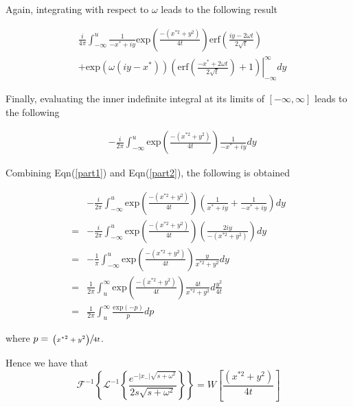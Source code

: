 \documentclass[10pt,a4,fleqn]{article}
\begin{document}
Again, integrating with respect to $\omega$ leads to the following result

\begin{equation}
\begin{split}
 &\frac{i}{4\pi}\int_{-\infty}^u \frac{1}{-x^*+iy}
   \mathrm{exp}\left(\frac{-(x^{*2} + y^2)}{4t}\right) 
   \mathrm{erf}\left(\frac{iy - 2\omega t}{2\sqrt{t}}\right)\\
    & +\left. \mathrm{exp}\left(\omega\left(iy - x^*\right)\right)\left(\mathrm{erf}\left(\frac{-x^*+2\omega t}{2\sqrt{t}}\right)+1\right) 
    \right\vert_{-\infty}^{\infty} dy
   \end{split}
\end{equation}

Finally, evaluating the inner indefinite integral at its limits of $\left[-\infty, \infty\right]$ leads to the following  

\begin{equation}\label{part2}
\begin{aligned}
   &-\frac{i}{2\pi}\int_{-\infty}^u \mathrm{exp}\left(\frac{-(x^{*2}+ y^2)}{4t}\right) \frac{1}{-x^*+iy}dy  
\end{aligned}
\end{equation}

Combining Eqn(\ref{part1}) and Eqn(\ref{part2}), the following is obtained

\begin{equation}
\begin{aligned}
    &-\frac{i}{2\pi}\int_{-\infty}^u  \mathrm{exp}\left(\frac{-\left(x^{*2}+ y^2\right)}{4t}\right)\left(\frac{1}{x^*+iy} + \frac{1}{-x^*+iy}\right)dy\\
    = &-\frac{i}{2\pi}\int_{-\infty}^u  \mathrm{exp}\left(\frac{-\left(x^{*2}+ y^2\right)}{4t}\right)\left(\frac{2iy}{-\left(x^{*2}+ y^2\right)}\right)dy\\
    = &-\frac{1}{\pi}\int_{-\infty}^u  \mathrm{exp}\left(\frac{-\left(x^{*2}+ y^2\right)}{4t}\right)\frac{y}{x^{*2}+ y^2}dy\\
    = &\frac{1}{2\pi}\int_{u}^{\infty}  \mathrm{exp}\left(\frac{-\left(x^{*2}+ y^2\right)}{4t}\right)\frac{4t}{x^{*2}+ y^2}d\frac{y^2}{4t}\\
    = &\frac{1}{2\pi}\int_{u}^{\infty} \frac{\mathrm{exp}\left(-p\right)}{p}dp
\end{aligned}
\end{equation}

where $p = \sfrac{\left(x^{*2}+ y^2\right)}{4t}$.

Hence we have that
\begin{equation}
    \mathcal{F}^{-1}\left\{ \mathscr{L}^{-1}\left\{ \frac{e^{-|x_-|\sqrt{s +\omega^2}}}{2s\sqrt{s +\omega^2}}\right\} \right\} = W\left[\frac{\left(x^{*2}+ y^2\right)}{4t}\right]
\end{equation}
\end{document}
